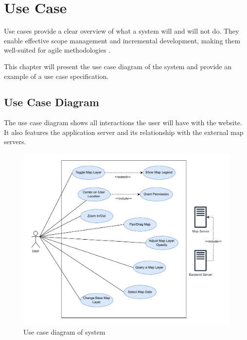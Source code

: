 \section{Use Case}

Use cases provide a clear overview of what a system will and will not do. They enable effective scope management and incremental development, making them well-suited for agile methodologies \cite{jacobson_use_case}. 

This chapter will present the use case diagram of the system and provide an example of a use case specification.

\subsection{Use Case Diagram}
The use case diagram shows all interactions the user will have with the website. It also features the application server and its relationship with the external map servers.
\begin{figure}[h]
    \centering
    \includegraphics[width=1\linewidth]{figures/use_case_diagram.pdf}
    \caption{Use case diagram of system}
    \label{fig:use_case_diagram}
\end{figure}

